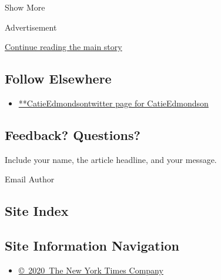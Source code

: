 Show More

Advertisement

\protect\hyperlink{after-mid2}{Continue reading the main story}

\hypertarget{follow-elsewhere}{%
\subsection{Follow Elsewhere}\label{follow-elsewhere}}

\begin{itemize}
\tightlist
\item
  \href{https://twitter.com/CatieEdmondson}{**CatieEdmondsontwitter page
  for CatieEdmondson}
\end{itemize}

\hypertarget{feedback-questions}{%
\subsection{Feedback? Questions?}\label{feedback-questions}}

Include your name, the article headline, and your message.

Email Author

\hypertarget{site-index}{%
\subsection{Site Index}\label{site-index}}

\hypertarget{site-information-navigation}{%
\subsection{Site Information
Navigation}\label{site-information-navigation}}

\begin{itemize}
\tightlist
\item
  \href{https://help.nytimes3xbfgragh.onion/hc/en-us/articles/115014792127-Copyright-notice}{©~2020~The
  New York Times Company}
\end{itemize}

